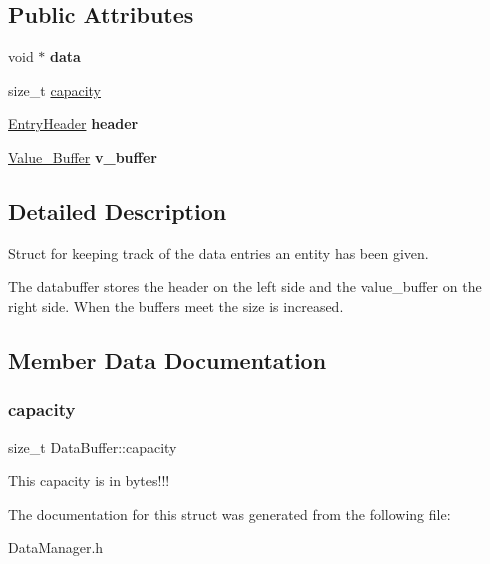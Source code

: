 \subsection*{Public Attributes}
\begin{DoxyCompactItemize}
\item 
\mbox{\label{struct_data_buffer_a2208d18584208dec2bffd37503e8f190}} 
void $\ast$ {\bfseries data}
\item 
size\+\_\+t \hyperlink{struct_data_buffer_adc799c19e2e48c7648f0dbdbe49e7981}{capacity}
\item 
\mbox{\label{struct_data_buffer_a709487cec6935f6695e466b5dfc9bc41}} 
\hyperlink{struct_entry_header}{Entry\+Header} {\bfseries header}
\item 
\mbox{\label{struct_data_buffer_ad7c49b83960cbfabc57ded2432151a5d}} 
\hyperlink{struct_value___buffer}{Value\+\_\+\+Buffer} {\bfseries v\+\_\+buffer}
\end{DoxyCompactItemize}


\subsection{Detailed Description}
Struct for keeping track of the data entries an entity has been given. 

The databuffer stores the header on the left side and the value\+\_\+buffer on the right side. When the buffers meet the size is increased. 

\subsection{Member Data Documentation}
\mbox{\label{struct_data_buffer_adc799c19e2e48c7648f0dbdbe49e7981}} 
\subsubsection{\texorpdfstring{capacity}{capacity}}
{\footnotesize\ttfamily size\+\_\+t Data\+Buffer\+::capacity}

This capacity is in bytes!!! 

The documentation for this struct was generated from the following file\+:\begin{DoxyCompactItemize}
\item 
Data\+Manager.\+h\end{DoxyCompactItemize}

